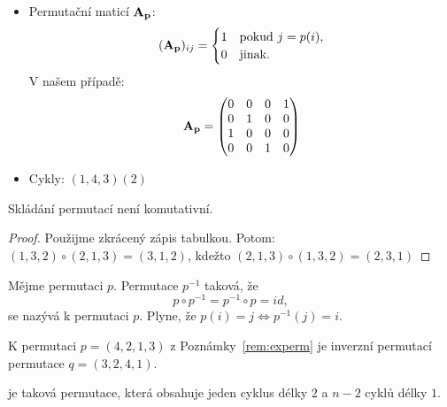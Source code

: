 \begin{remark}
\begin{itemize}
\begin{center}
            \end{center}
        \item Permutační maticí $\mathbf{A_p}$: 
            $$ (\mathbf{A_p})_{ij} = \begin{cases}
                1 &\text{pokud } j=p(i), \\
                0 &\text{jinak.}
            \end{cases}$$
            V našem případě: 
            $$\mathbf{A_p} = \begin{pmatrix}
                0 &0 &0 &1 \\
                0 &1 &0 &0 \\
                1 &0 &0 &0 \\
                0 &0 &1 &0
            \end{pmatrix}$$
        \item Cykly: $(1,4,3)(2)$
    \end{itemize}
\end{remark}

\begin{observation}
    Skládání permutací není komutativní.
\end{observation}

\begin{proof}
    Použijme zkrácený zápis tabulkou. Potom:
    $(1, 3, 2) \circ (2,1,3) = (3, 1, 2)$, kdežto $(2,1,3) \circ (1,3,2) 
    = (2,3,1)$
\end{proof}

\begin{definition}
    Mějme permutaci $p$. Permutace $p^{-1}$ taková, že $$p \circ p^{-1} = 
    p^{-1} \circ p = id,$$ se nazývá  k 
    permutaci $p$. Plyne, že $p(i) = j \iff p^{-1}(j) = i$.
\end{definition}

\begin{remark}
    K permutaci $p = (4,2,1,3)$ z Poznámky~\ref{rem:experm} je inverzní
    permutací permutace $q = (3,2,4,1)$.
\end{remark}

\begin{definition}
     je taková permutace, která obsahuje jeden cyklus
    délky $2$ a $n-2$ cyklů délky $1$.
\end{definition}

